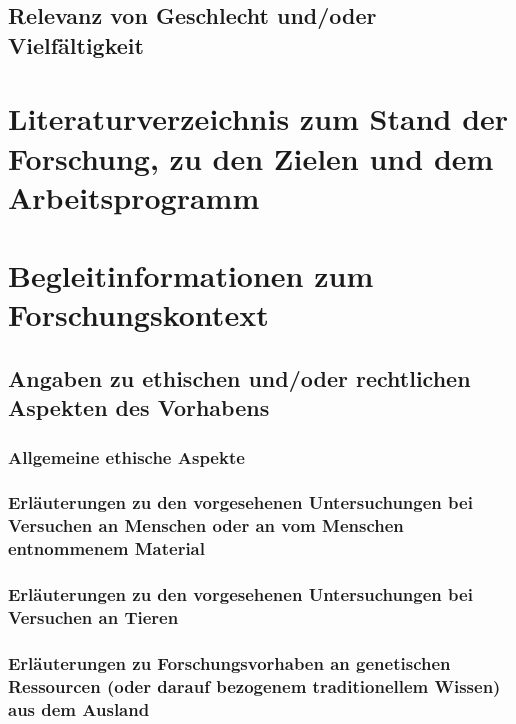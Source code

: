 \documentclass{scrartcl}
\begin{document}
\subsection{Relevanz von Geschlecht und/oder Vielfältigkeit}

\section{Literaturverzeichnis zum Stand der Forschung, zu den Zielen und dem Arbeitsprogramm}
\label{sec:bib}
\newrefcontext[labelprefix= ]
\printbibliography[notcategory=reviewed, notcategory=nonreviewed, notcategory=patents_pending, notcategory=patents, heading=none, env=bibliographyNUM]

\backmatter
\section{Begleitinformationen zum Forschungskontext}

\subsection{Angaben zu ethischen und/oder rechtlichen Aspekten des Vorhabens}

\subsubsection{Allgemeine ethische Aspekte}

\subsubsection{Erläuterungen zu den vorgesehenen Untersuchungen bei Versuchen an 
Menschen oder an vom Menschen entnommenem Material}

\subsubsection{Erläuterungen zu den vorgesehenen Untersuchungen bei Versuchen an Tieren}

\subsubsection{Erläuterungen zu Forschungsvorhaben an genetischen Ressourcen (oder 
darauf bezogenem traditionellem Wissen) aus dem Ausland}
\end{document}
